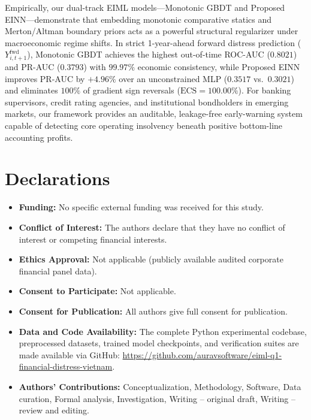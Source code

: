 \documentclass[pdflatex,sn-mathphys-num,twocolumn]{sn-jnl}
\theoremstyle{thmstyleone}
\theoremstyle{thmstyletwo}
\theoremstyle{thmstylethree}
\begin{document}
Empirically, our dual-track EIML models---Monotonic GBDT and Proposed EINN---demonstrate that embedding monotonic comparative statics and Merton/Altman boundary priors acts as a powerful structural regularizer under macroeconomic regime shifts. In strict 1-year-ahead forward distress prediction ($Y_{i,t+1}^{\text{fwd}}$), Monotonic GBDT achieves the highest out-of-time ROC-AUC ($0.8021$) and PR-AUC ($0.3793$) with $99.97\%$ economic consistency, while Proposed EINN improves PR-AUC by $+4.96\%$ over an unconstrained MLP ($0.3517$ vs.\ $0.3021$) and eliminates $100\%$ of gradient sign reversals ($\text{ECS} = 100.00\%$). For banking supervisors, credit rating agencies, and institutional bondholders in emerging markets, our framework provides an auditable, leakage-free early-warning system capable of detecting core operating insolvency beneath positive bottom-line accounting profits.

%


\section*{Declarations}
\begin{itemize}
    \item \textbf{Funding:} No specific external funding was received for this study.
    \item \textbf{Conflict of Interest:} The authors declare that they have no conflict of interest or competing financial interests.
    \item \textbf{Ethics Approval:} Not applicable (publicly available audited corporate financial panel data).
    \item \textbf{Consent to Participate:} Not applicable.
    \item \textbf{Consent for Publication:} All authors give full consent for publication.
    \item \textbf{Data and Code Availability:} The complete Python experimental codebase, preprocessed datasets, trained model checkpoints, and verification suites are made available via GitHub: \url{https://github.com/auravsoftware/eiml-q1-financial-distress-vietnam}.
    \item \textbf{Authors' Contributions:} Conceptualization, Methodology, Software, Data curation, Formal analysis, Investigation, Writing -- original draft, Writing -- review and editing.
\end{itemize}


\end{document}
